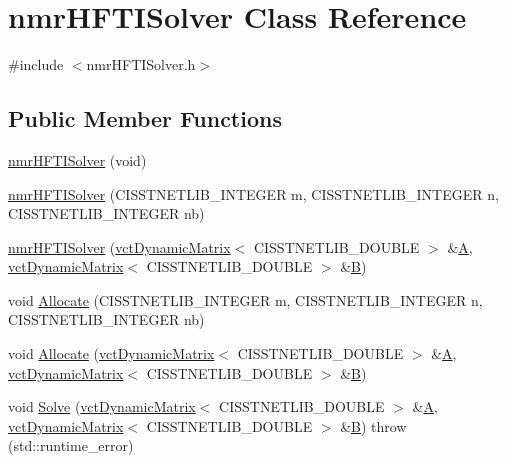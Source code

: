 \hypertarget{classnmr_h_f_t_i_solver}{}\section{nmr\+H\+F\+T\+I\+Solver Class Reference}
\label{classnmr_h_f_t_i_solver}


{\ttfamily \#include $<$nmr\+H\+F\+T\+I\+Solver.\+h$>$}

\subsection*{Public Member Functions}
\begin{DoxyCompactItemize}
\item 
\hyperlink{classnmr_h_f_t_i_solver_acd47d95a501ba8a42cfd0e5fffffcc1c}{nmr\+H\+F\+T\+I\+Solver} (void)
\item 
\hyperlink{classnmr_h_f_t_i_solver_a1d1979ba72f47f23d3d2c565dd61105e}{nmr\+H\+F\+T\+I\+Solver} (C\+I\+S\+S\+T\+N\+E\+T\+L\+I\+B\+\_\+\+I\+N\+T\+E\+G\+E\+R m, C\+I\+S\+S\+T\+N\+E\+T\+L\+I\+B\+\_\+\+I\+N\+T\+E\+G\+E\+R n, C\+I\+S\+S\+T\+N\+E\+T\+L\+I\+B\+\_\+\+I\+N\+T\+E\+G\+E\+R nb)
\item 
\hyperlink{classnmr_h_f_t_i_solver_ae4642e2e44537e2c93f50510a573818a}{nmr\+H\+F\+T\+I\+Solver} (\hyperlink{classvct_dynamic_matrix}{vct\+Dynamic\+Matrix}$<$ C\+I\+S\+S\+T\+N\+E\+T\+L\+I\+B\+\_\+\+D\+O\+U\+B\+L\+E $>$ \&\hyperlink{classnmr_h_f_t_i_solver_a3bf7da50e30b56b35fa988819596c883}{A}, \hyperlink{classvct_dynamic_matrix}{vct\+Dynamic\+Matrix}$<$ C\+I\+S\+S\+T\+N\+E\+T\+L\+I\+B\+\_\+\+D\+O\+U\+B\+L\+E $>$ \&\hyperlink{classnmr_h_f_t_i_solver_a208b4bacf42c9d2b336f40a84f1f24b4}{B})
\item 
void \hyperlink{classnmr_h_f_t_i_solver_ac8d79d430a8c1927069bf777ea22d76b}{Allocate} (C\+I\+S\+S\+T\+N\+E\+T\+L\+I\+B\+\_\+\+I\+N\+T\+E\+G\+E\+R m, C\+I\+S\+S\+T\+N\+E\+T\+L\+I\+B\+\_\+\+I\+N\+T\+E\+G\+E\+R n, C\+I\+S\+S\+T\+N\+E\+T\+L\+I\+B\+\_\+\+I\+N\+T\+E\+G\+E\+R nb)
\item 
void \hyperlink{classnmr_h_f_t_i_solver_a3a6042bd4730932aae51c182c195ec16}{Allocate} (\hyperlink{classvct_dynamic_matrix}{vct\+Dynamic\+Matrix}$<$ C\+I\+S\+S\+T\+N\+E\+T\+L\+I\+B\+\_\+\+D\+O\+U\+B\+L\+E $>$ \&\hyperlink{classnmr_h_f_t_i_solver_a3bf7da50e30b56b35fa988819596c883}{A}, \hyperlink{classvct_dynamic_matrix}{vct\+Dynamic\+Matrix}$<$ C\+I\+S\+S\+T\+N\+E\+T\+L\+I\+B\+\_\+\+D\+O\+U\+B\+L\+E $>$ \&\hyperlink{classnmr_h_f_t_i_solver_a208b4bacf42c9d2b336f40a84f1f24b4}{B})
\item 
void \hyperlink{classnmr_h_f_t_i_solver_a8c93b7bdf19fc68959a774cae5504d28}{Solve} (\hyperlink{classvct_dynamic_matrix}{vct\+Dynamic\+Matrix}$<$ C\+I\+S\+S\+T\+N\+E\+T\+L\+I\+B\+\_\+\+D\+O\+U\+B\+L\+E $>$ \&\hyperlink{classnmr_h_f_t_i_solver_a3bf7da50e30b56b35fa988819596c883}{A}, \hyperlink{classvct_dynamic_matrix}{vct\+Dynamic\+Matrix}$<$ C\+I\+S\+S\+T\+N\+E\+T\+L\+I\+B\+\_\+\+D\+O\+U\+B\+L\+E $>$ \&\hyperlink{classnmr_h_f_t_i_solver_a208b4bacf42c9d2b336f40a84f1f24b4}{B})  throw (std\+::runtime\+\_\+error)
\end{DoxyCompactItemize}
